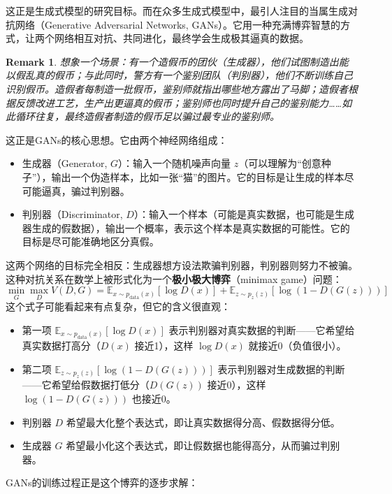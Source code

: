 \documentclass[lang=cn,zihao=-4,a4paper,fontset=windows]{beautybook}
\newtheorem*{remark}{\textbf{Remark}}
\begin{document}
这正是生成式模型的研究目标。而在众多生成式模型中，最引人注目的当属生成对抗网络（Generative Adversarial Networks, GANs）。它用一种充满博弈智慧的方式，让两个网络相互对抗、共同进化，最终学会生成极其逼真的数据。

\begin{remark}
想象一个场景：有一个造假币的团伙（生成器），他们试图制造出能以假乱真的假币；与此同时，警方有一个鉴别团队（判别器），他们不断训练自己识别假币。造假者每制造一批假币，鉴别师就指出哪些地方露出了马脚；造假者根据反馈改进工艺，生产出更逼真的假币；鉴别师也同时提升自己的鉴别能力……如此循环往复，最终造假者制造的假币足以骗过最专业的鉴别师。
\end{remark}
这正是GANs的核心思想。它由两个神经网络组成：
\begin{itemize}
\item 生成器（Generator, \(G\)）：输入一个随机噪声向量 \(z\)（可以理解为“创意种子”），输出一个伪造样本，比如一张“猫”的图片。它的目标是让生成的样本尽可能逼真，骗过判别器。
\item 判别器（Discriminator, \(D\)）：输入一个样本（可能是真实数据，也可能是生成器生成的假数据），输出一个概率，表示这个样本是真实数据的可能性。它的目标是尽可能准确地区分真假。
\end{itemize}
这两个网络的目标完全相反：生成器想方设法欺骗判别器，判别器则努力不被骗。这种对抗关系在数学上被形式化为一个\textbf{极小极大博弈}（minimax game）问题：
\[
\min_G \max_D V(D, G) = \displaystyle\mathbb{E}_{x \sim p_{\text{data}}(x)}[\log D(x)] + \mathbb{E}_{z \sim p_z(z)}[\log(1 - D(G(z)))]
\]
这个式子可能看起来有点复杂，但它的含义很直观：
\begin{itemize}
\item  第一项 \(\mathbb{E}_{x \sim p_{\text{data}}(x)}[\log D(x)]\) 表示判别器对真实数据的判断——它希望给真实数据打高分（\(D(x)\) 接近1），这样 \(\log D(x)\) 就接近0（负值很小）。
\item  第二项 \(\mathbb{E}_{z \sim p_z(z)}[\log(1 - D(G(z)))]\) 表示判别器对生成数据的判断——它希望给假数据打低分（\(D(G(z))\) 接近0），这样 \(\log(1 - D(G(z)))\) 也接近0。
\item  判别器 \(D\) 希望最大化整个表达式，即让真实数据得分高、假数据得分低。
\item  生成器 \(G\) 希望最小化这个表达式，即让假数据也能得高分，从而骗过判别器。
\end{itemize}

GANs的训练过程正是这个博弈的逐步求解：
\end{document}
